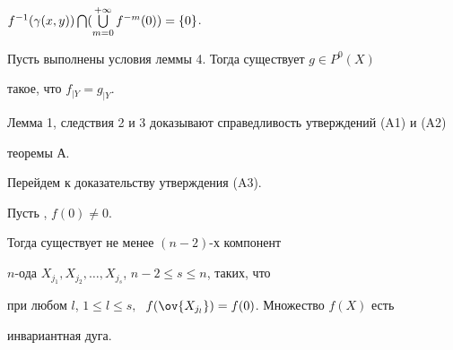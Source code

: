 $f^{-1}(\ga (x,y))\bigcap\linebreak




(\ty )=\{ 0\}$.





\begin{cor} Пусть выполнены условия леммы 4. Тогда существует $g\in P^0(X)$


такое, что $f_{\mid Y}=g_{\mid Y}$.


\end{cor}





Лемма 1, следствия 2 и 3 доказывают справедливость утверждений (A1) и (A2)


теоремы А.





Перейдем к доказательству утверждения (A3).





\begin{lem} Пусть \fm{}, $f(0)\ne 0$.


Тогда существует не менее $(n-2)$-х компонент


$n$-ода $X_{j_1},X_{j_2},\dotsc,X_{j_s}$, $n-2\le s\le n$, таких, что


при любом $l$, $1\le l\le s,\;$ $f(\ov{X_{j_l}})=f(0)$. Множество $f(X)$ есть


инвариантная дуга.


\end{lem}





